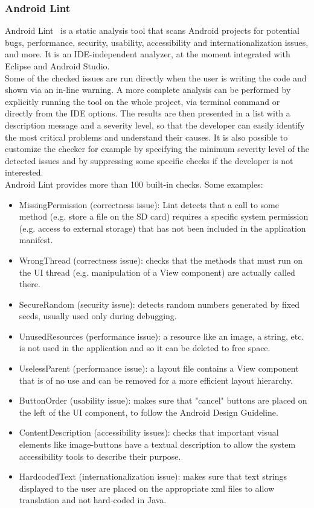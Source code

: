 \documentclass[11pt,a4paper,notitlepage]{article}
\begin{document}
\subsubsection{Android Lint}
Android Lint~\cite{Lint} is a static analysis tool that scans Android projects for potential bugs, performance, security, usability, accessibility and internationalization issues, and more. It is an IDE-independent analyzer, at the moment integrated with Eclipse and Android Studio.\medskip \\
Some of the checked issues are run directly when the user is writing the code and shown via an in-line warning. A more complete analysis can be performed by explicitly running the tool on the whole project, via terminal command or directly from the IDE options. The results are then presented in a list with a description message and a severity level, so that the developer can easily identify the most critical problems and understand their causes. It is also possible to customize the checker for example by specifying the minimum severity level of the detected issues and by suppressing some specific checks if the developer is not interested.\medskip \\
Android Lint provides more than 100 built-in checks. Some examples:
\begin{itemize}
	\item MissingPermission (correctness issue): Lint detects that a call to some method (e.g. store a file on the SD card) requires a specific system permission (e.g. access to external storage) that has not been included in the application manifest.
	\item WrongThread (correctness issue): checks that the methods that must run on the UI thread (e.g. manipulation of a View component) are actually called there.
	\item SecureRandom (security issue): detects random numbers generated by fixed seeds, usually used only during debugging.
	\item UnusedResources (performance issue): a resource like an image, a string, etc. is not used in the application and so it can be deleted to free space.
	\item UselessParent (performance issue): a layout file contains a View component that is of no use and can be removed for a more efficient layout hierarchy.
	\item ButtonOrder (usability issue): makes sure that "cancel" buttons are placed on the left of the UI component, to follow the Android Design Guideline.
	\item ContentDescription (accessibility issues): checks that important visual elements like image-buttons have a textual description to allow the system accessibility tools to describe their purpose.
	\item HardcodedText (internationalization issue): makes sure that text strings displayed to the user are placed on the appropriate xml files to allow translation and not hard-coded in Java.
\end{itemize}
\end{document}
